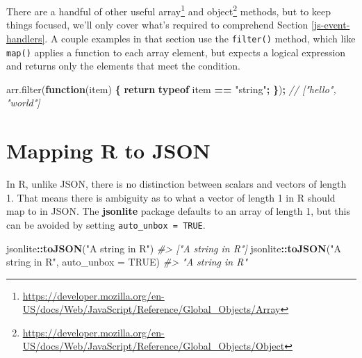 \documentclass[
  12pt,
]{krantz}
\newenvironment{Shaded}{\begin{snugshade}}{\end{snugshade}}
\newcommand{\AttributeTok}[1]{\textcolor[rgb]{0.77,0.63,0.00}{#1}}
\newcommand{\CommentTok}[1]{\textcolor[rgb]{0.56,0.35,0.01}{\textit{#1}}}
\newcommand{\ControlFlowTok}[1]{\textcolor[rgb]{0.13,0.29,0.53}{\textbf{#1}}}
\newcommand{\DataTypeTok}[1]{\textcolor[rgb]{0.13,0.29,0.53}{#1}}
\newcommand{\KeywordTok}[1]{\textcolor[rgb]{0.13,0.29,0.53}{\textbf{#1}}}
\newcommand{\NormalTok}[1]{#1}
\newcommand{\OperatorTok}[1]{\textcolor[rgb]{0.81,0.36,0.00}{\textbf{#1}}}
\newcommand{\OtherTok}[1]{\textcolor[rgb]{0.56,0.35,0.01}{#1}}
\newcommand{\StringTok}[1]{\textcolor[rgb]{0.31,0.60,0.02}{#1}}
\newcommand{\VariableTok}[1]{\textcolor[rgb]{0.00,0.00,0.00}{#1}}
\renewcommand{\href}[2]{#2\footnote{\url{#1}}}
\begin{document}
There are a handful of other useful \href{https://developer.mozilla.org/en-US/docs/Web/JavaScript/Reference/Global_Objects/Array}{array} and \href{https://developer.mozilla.org/en-US/docs/Web/JavaScript/Reference/Global_Objects/Object}{object} methods, but to keep things focused, we'll only cover what's required to comprehend Section \ref{js-event-handlers}. A couple examples in that section use the \texttt{filter()} method, which like \texttt{map()} applies a function to each array element, but expects a logical expression and returns only the elements that meet the condition.

\begin{Shaded}
\begin{Highlighting}[]
\VariableTok{arr}\NormalTok{.}\AttributeTok{filter}\NormalTok{(}\KeywordTok{function}\NormalTok{(item) }\OperatorTok{\{} \ControlFlowTok{return} \KeywordTok{typeof}\NormalTok{ item }\OperatorTok{==} \StringTok{"string"}\OperatorTok{;} \OperatorTok{\}}\NormalTok{)}\OperatorTok{;}
\CommentTok{// ["hello", "world"]}
\end{Highlighting}
\end{Shaded}

\hypertarget{mapping-r-to-json}{%
\section{Mapping R to JSON}\label{mapping-r-to-json}}

In R, unlike JSON, there is no distinction between scalars and vectors of length 1. That means there is ambiguity as to what a vector of length 1 in R should map to in JSON. The \textbf{jsonlite} package defaults to an array of length 1, but this can be avoided by setting \texttt{auto\_unbox\ =\ TRUE}.

\begin{Shaded}
\begin{Highlighting}[]
\NormalTok{jsonlite}\OperatorTok{::}\KeywordTok{toJSON}\NormalTok{(}\StringTok{"A string in R"}\NormalTok{)}
\CommentTok{#> ["A string in R"]}
\NormalTok{jsonlite}\OperatorTok{::}\KeywordTok{toJSON}\NormalTok{(}\StringTok{"A string in R"}\NormalTok{, }\DataTypeTok{auto_unbox =} \OtherTok{TRUE}\NormalTok{)}
\CommentTok{#> "A string in R"}
\end{Highlighting}
\end{Shaded}
\end{document}
